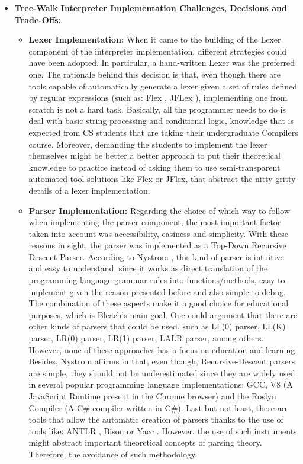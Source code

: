 \begin{itemize}
    \item \textbf{Tree-Walk Interpreter Implementation Challenges, Decisions and Trade-Offs:}
    \begin{itemize}
    
        \item \textbf{Lexer Implementation:} When it came to the building of the Lexer component of the interpreter implementation, different strategies could have been adopted. In particular, a hand-written Lexer was the preferred one. The rationale behind this decision is that, even though there are tools capable of automatically generate a lexer given a set of rules defined by regular expressions (such as: Flex \cite{Flex} \cite{wiki_Flex}, JFLex \cite{klein2010jflex}), implementing one from scratch is not a hard task. Basically, all the programmer needs to do is deal with basic string processing and conditional logic, knowledge that is expected from CS students that are taking their undergraduate Compilers course. Moreover, demanding the students to implement the lexer themselves might be better a better approach to put their theoretical knowledge to practice instead of asking them to use semi-transparent automated tool solutions like Flex or JFlex, that abstract the nitty-gritty details of a lexer implementation.

        \item \textbf{Parser Implementation:} Regarding the choice of which way to follow when implementing the parser component, the most important factor taken into account was accessibility, easiness and simplicity. With these reasons in sight, the parser was implemented as a Top-Down Recursive Descent Parser. According to Nystrom \cite{nystrom2021crafting}, this kind of parser is intuitive and easy to understand, since it works as direct translation of the programming language grammar rules into functions/methods, easy to implement given the reason presented before and also simple to debug. The combination of these aspects make it a good choice for educational purposes, which is Bleach's main goal. One could argument that there are other kinds of parsers that could be used, such as LL(0) parser, LL(K) parser, LR(0) parser, LR(1) parser, LALR parser, among others. However, none of these approaches has a focus on education and learning. Besides, Nystrom affirms in \cite{nystrom2021crafting} that, even though, Recursive-Descent parsers are simple, they should not be underestimated since they are widely used in several popular programming language implementations: GCC, V8 (A JavaScript Runtime present in the Chrome browser) and the Roslyn Compiler (A C\# compiler written in C\#). Last but not least, there are tools that allow the automatic creation of parsers thanks to the use of tools like: ANTLR \cite{ANTLR}, Bison \cite{Bison} or Yacc \cite{johnson1975yacc} \cite{Yacc}. However, the use of such instruments might abstract important theoretical concepts of parsing theory. Therefore, the avoidance of such methodology.
        

\end{itemize}
\end{itemize}
